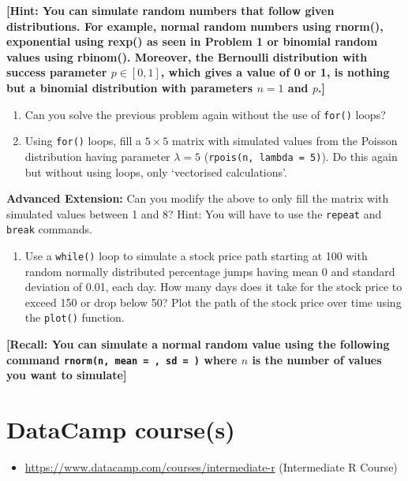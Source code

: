 \documentclass[
]{book}
\providecommand{\tightlist}{%
  \setlength{\itemsep}{0pt}\setlength{\parskip}{0pt}}
\theoremstyle{definition}
\theoremstyle{definition}
\theoremstyle{definition}
\theoremstyle{definition}
\theoremstyle{remark}
\begin{document}
\textbf{{[}Hint: You can simulate random numbers that follow given distributions. For example, normal random numbers using rnorm(), exponential using rexp() as seen in Problem 1 or binomial random values using rbinom(). Moreover, the Bernoulli distribution with success parameter \(p \in [0,1]\), which gives a value of 0 or 1, is nothing but a binomial distribution with parameters \(n =1\) and \(p\).{]}}

\begin{enumerate}
\def\labelenumi{\arabic{enumi}.}
\setcounter{enumi}{7}
\item
  Can you solve the previous problem again without the use of \texttt{for()} loops?
\item
  Using \texttt{for()} loops, fill a \(5 \times 5\) matrix with simulated values from the Poisson distribution having parameter \(\lambda = 5\) (\texttt{rpois(n,\ lambda\ =\ 5)}). Do this again but without using loops, only `vectorised calculations'.
\end{enumerate}

\textbf{Advanced Extension:} Can you modify the above to only fill the matrix with simulated values between 1 and 8? Hint: You will have to use the \texttt{repeat} and \texttt{break} commands.

\begin{enumerate}
\def\labelenumi{\arabic{enumi}.}
\setcounter{enumi}{9}
\tightlist
\item
  Use a \texttt{while()} loop to simulate a stock price path starting at 100 with random normally distributed percentage jumps having mean 0 and standard deviation of 0.01, each day. How many days does it take for the stock price to exceed 150 or drop below 50? Plot the path of the stock price over time using the \texttt{plot()} function.
\end{enumerate}

\textbf{{[}Recall: You can simulate a normal random value using the following command \texttt{rnorm(n,\ mean\ =\ ,\ sd\ =\ )} where \(n\) is the number of values you want to simulate{]}}

\hypertarget{datacamp-courses-2}{%
\section{DataCamp course(s)}\label{datacamp-courses-2}}

\begin{itemize}
\tightlist
\item
  \url{https://www.datacamp.com/courses/intermediate-r} (Intermediate R Course)
\end{itemize}
\end{document}
